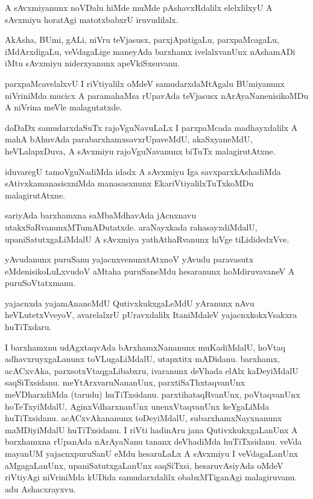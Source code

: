 \begin{mng}
A sAvxmiyanunx noVDalu hiMde muMde pAshavxRdalilx elelxlilxyU A sAvxmiyu horatAgi matotxbabxrU iruvudilalx.
\end{mng}

\begin{mng}
AkAsha, BUmi, gALi, niVru teVjasusx, parxjApatigaLu, parxpaMcagaLu, iMdArxdigaLu, veVdagaLige maneyAda barxhamx ivelalxvanUnx nAshamADi iMtu sAvxmiyu niderxyanunx apeVkiSxsuvanu.
\end{mng}

\begin{mng}
parxpaMcavelalxvU I riVtiyalilx oMdeV samudarxdaMtAgalu BUmiyanunx niVriniMda mucicx A paramahaMsa rUpavAda teVjasusx nArAyaNanenisikoMDu A niVrina meVle malagutatxde.
\end{mng}

\begin{mng}
doDaDx samudarxdaSuTx rajoVguNavuLaLx I parxpaMcada madhayxdalilx A mahA bAhuvAda parabarxhamxsavxrUpaveMdU, akaSxyaneMdU, heVLalapxDuva, A sAvxmiyu rajoVguNavanunx biTuTx malagirutAtxne.
\end{mng}

\begin{mng}
iduvaregU tamoVguNadiMda idadx A sAvxmiyu Iga savxparxkAshadiMda sAtivxkamanasisxniMda manasasxnunx EkariVtiyalilxTuTxkoMDu malagirutAtxne.
\end{mng}

\begin{mng}
sariyAda barxhamxna saMbaMdhavAda jAcnxnavu utakxSaRvanunxMTumADutatxde. araNayxkada rahasayxdiMdalU, upaniSatutxgaLiMdalU A sAvxmiya yathAthaRvanunx hiVge tiLididedxVve.
\end{mng}

\begin{mng}
yAvudanunx puruSanu yajacnxvenunxtAtxnoV yAvudu paravasutx eMdenisikoLuLxvudoV aMtaha puruSaneMdu hesaranunx hoMdiruvavaneV A puruSoVtatxmanu.
\end{mng}

\begin{mng}
yajacnxda yajamAnaneMdU QutivxkukxgaLeMdU yAranunx nAvu heVLutetxVveyoV, avarelalxrU pUravxdalilx ItaniMdaleV yajacnxkokxVsakxra huTiTxdaru.
\end{mng}

\begin{mng}
I barxhamxnu udAgxtaqvAda bArxhamxNananunx muKadiMdalU, hoVtaq adhavxruyxgaLanunx toVLugaLiMdalU, utapxtitx mADidanu. barxhamx, acACxvAka, parxsotxVtaqgaLibabxru, ivaranunx deVhada elAlx kaDeyiMdalU saqSiTxsidanu. meYtArxvaruNananUnx, parxtiSaThxtaqvanUnx meVDharxdiMda (tarudu) huTiTxsidanu. parxtihataqRvanUnx, poVtaqvanUnx hoTeTxyiMdalU, AginxVdharxnanUnx unenxVtaqvanUnx keYgaLiMda huTiTxsidanu. acACxvAkananunx toDeyiMdalU, subarxhamxNayxnanunx maMDiyiMdalU huTiTxsidanu. I riVti hadinAru jana QutivxkukxgaLanUnx A barxhamxna rUpanAda nArAyaNanu tananx deVhadiMda huTiTxsidanu. veVda mayanUM yajacnxpuruSanU eMdu hesaruLaLx A sAvxmiyu I veVdagaLanUnx aMgagaLanUnx, upaniSatutxgaLanUnx saqSiTxsi, hesaruvAsiyAda oMdeV riVtiyAgi niVriniMda kUDida samudarxdalilx obabxMTiganAgi malagiruvanu. adu Ashacxrayxvu.
\end{mng}

